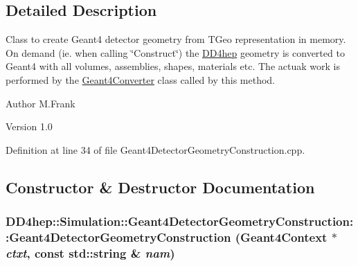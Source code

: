 \subsection{Detailed Description}
Class to create Geant4 detector geometry from TGeo representation in memory. On demand (ie. when calling \char`\"{}Construct\char`\"{}) the \hyperlink{namespace_d_d4hep}{DD4hep} geometry is converted to Geant4 with all volumes, assemblies, shapes, materials etc. The actuak work is performed by the \hyperlink{class_d_d4hep_1_1_simulation_1_1_geant4_converter}{Geant4Converter} class called by this method.

\begin{DoxyAuthor}{Author}
M.Frank 
\end{DoxyAuthor}
\begin{DoxyVersion}{Version}
1.0 
\end{DoxyVersion}


Definition at line 34 of file Geant4DetectorGeometryConstruction.cpp.

\subsection{Constructor \& Destructor Documentation}
\hypertarget{class_d_d4hep_1_1_simulation_1_1_geant4_detector_geometry_construction_a7de5c95809423c7c96d5ce0fa2b275de}{
\subsubsection[{Geant4DetectorGeometryConstruction}]{\setlength{\rightskip}{0pt plus 5cm}DD4hep::Simulation::Geant4DetectorGeometryConstruction::Geant4DetectorGeometryConstruction ({\bf Geant4Context} $\ast$ {\em ctxt}, \/  const std::string \& {\em nam})}}
\label{class_d_d4hep_1_1_simulation_1_1_geant4_detector_geometry_construction_a7de5c95809423c7c96d5ce0fa2b275de}


